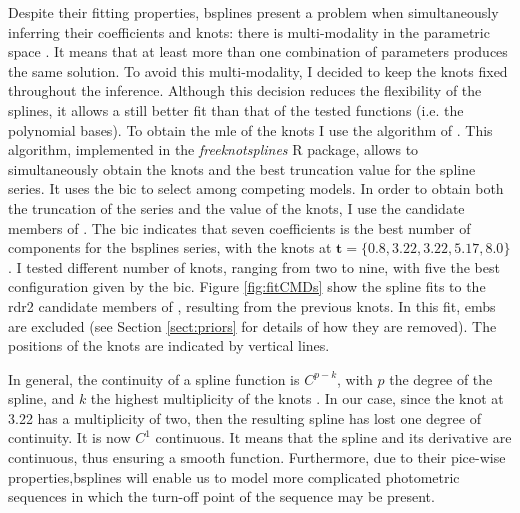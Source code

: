 Despite their fitting properties, \glspl{bspline} present a problem when simultaneously inferring their coefficients and knots: there is multi-modality in the parametric space \citep{Lindstrom1999}. It means that at least more than one combination of parameters produces the same solution. To avoid this multi-modality, I decided to keep the knots fixed throughout the inference. Although this decision reduces the flexibility of the splines, it allows a still better fit than that of the tested functions (i.e. the polynomial bases). To obtain the \gls{mle} of the knots I use the algorithm of  \citet{Spiriti2013}. This algorithm, implemented in the \emph{freeknotsplines} R package, allows to simultaneously obtain the knots and the best truncation value for the spline series. It uses the \gls{bic} to select among competing models. In order to obtain both the truncation of the series and the value of the knots, I use the candidate members of \citet{Bouy2015}. The \gls{bic} indicates that seven coefficients is the best number of components for the \glspl{bspline} series, with the knots at $\mathbf{t}=\{0.8,3.22,3.22,5.17,8.0\}$. I tested different number of knots, ranging from two to nine, with five the best configuration given by the \gls{bic}. Figure \ref{fig:fitCMDs} show the spline fits to the \gls{rdr2} candidate members of \citet{Bouy2015}, resulting from the previous knots. In this fit, \glspl{emb} are excluded (see Section \ref{sect:priors} for details of how they are removed). The positions of the knots are indicated by vertical lines.

In general, the continuity of a spline function is $C^{p-k}$, with $p$ the degree of the spline, and $k$ the highest multiplicity of the knots \citep{deBoor1978}. In our case, since the knot at 3.22 has a multiplicity of two, then the resulting spline has lost one degree of continuity. It is now $C^1$ continuous. It means that the spline and its derivative are continuous, thus ensuring a smooth function. Furthermore, due to their pice-wise properties,\glspl{bspline} will enable us to model more complicated photometric sequences in which the turn-off point of the sequence may be present.

